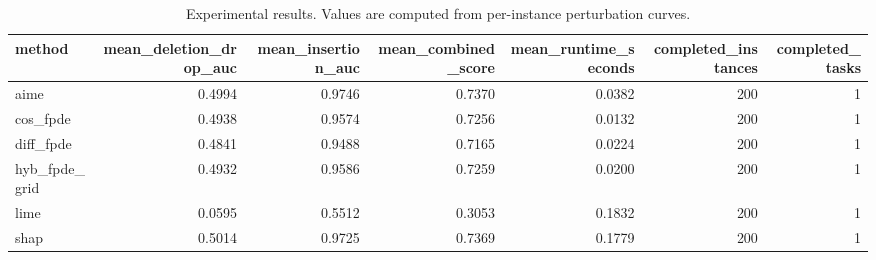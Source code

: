 \begin{table}[t]
\caption{Experimental results. Values are computed from per-instance perturbation curves.}
\label{tab:main_results_computed}
\centering
\begin{tabular}{lrrrrrr}
\toprule
method & mean\_deletion\_drop\_auc & mean\_insertion\_auc & mean\_combined\_score & mean\_runtime\_seconds & completed\_instances & completed\_tasks \\
\midrule
aime & 0.4994 & 0.9746 & 0.7370 & 0.0382 & 200 & 1 \\
cos\_fpde & 0.4938 & 0.9574 & 0.7256 & 0.0132 & 200 & 1 \\
diff\_fpde & 0.4841 & 0.9488 & 0.7165 & 0.0224 & 200 & 1 \\
hyb\_fpde\_grid & 0.4932 & 0.9586 & 0.7259 & 0.0200 & 200 & 1 \\
lime & 0.0595 & 0.5512 & 0.3053 & 0.1832 & 200 & 1 \\
shap & 0.5014 & 0.9725 & 0.7369 & 0.1779 & 200 & 1 \\
\bottomrule
\end{tabular}

\end{table}
